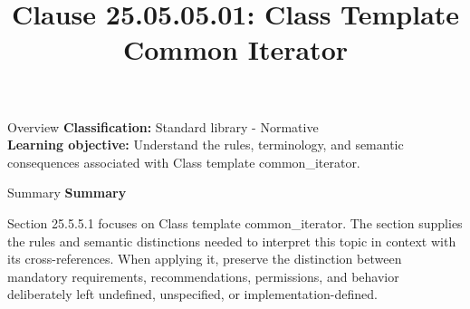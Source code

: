 \documentclass[10pt,letterpaper]{article}
\title{Clause 25.05.05.01: Class Template Common Iterator}
\author{}
\date{}
\begin{document}
\maketitle
\begin{CornellOverviewBox}{Overview}
\textbf{Classification:} Standard library - Normative\\[2pt]
\textbf{Learning objective:} Understand the rules, terminology, and semantic consequences associated with Class template common\_iterator.
\end{CornellOverviewBox}\begin{CornellSummaryBox}{Summary}
{\sffamily\bfseries\color{Accent} Summary}\par\vspace{3pt}Section 25.5.5.1 focuses on Class template common\_iterator. The section supplies the rules and semantic distinctions needed to interpret this topic in context with its cross-references. When applying it, preserve the distinction between mandatory requirements, recommendations, permissions, and behavior deliberately left undefined, unspecified, or implementation-defined.
\end{CornellSummaryBox}
\end{document}
